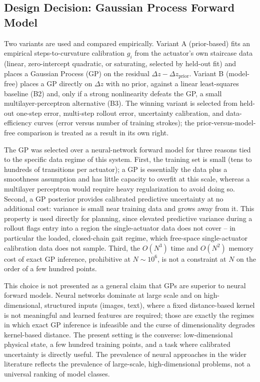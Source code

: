 \subsection{Design Decision: Gaussian Process Forward Model}

Two variants are used and compared empirically. Variant A (prior-based) fits an empirical steps-to-curvature calibration $g_i$ from the actuator's own staircase data (linear, zero-intercept quadratic, or saturating, selected by held-out fit) and places a Gaussian Process (GP) on the residual $\Delta z - \Delta z_{\mathrm{prior}}$. Variant B (model-free) places a GP directly on $\Delta z$ with no prior, against a linear least-squares baseline (B2) and, only if a strong nonlinearity defeats the GP, a small multilayer-perceptron alternative (B3). The winning variant is selected from held-out one-step error, multi-step rollout error, uncertainty calibration, and data-efficiency curves (error versus number of training strokes); the prior-versus-model-free comparison is treated as a result in its own right.

The GP was selected over a neural-network forward model for three reasons tied to the specific data regime of this system. First, the training set is small (tens to hundreds of transitions per actuator); a GP is essentially the data plus a smoothness assumption and has little capacity to overfit at this scale, whereas a multilayer perceptron would require heavy regularization to avoid doing so. Second, a GP posterior provides calibrated predictive uncertainty at no additional cost: variance is small near training data and grows away from it. This property is used directly for planning, since elevated predictive variance during a rollout flags entry into a region the single-actuator data does not cover -- in particular the loaded, closed-chain gait regime, which free-space single-actuator calibration data does not sample. Third, the $O(N^3)$ time and $O(N^2)$ memory cost of exact GP inference, prohibitive at $N \sim 10^6$, is not a constraint at $N$ on the order of a few hundred points.

This choice is not presented as a general claim that GPs are superior to neural forward models. Neural networks dominate at large scale and on high-dimensional, structured inputs (images, text), where a fixed distance-based kernel is not meaningful and learned features are required; those are exactly the regimes in which exact GP inference is infeasible and the curse of dimensionality degrades kernel-based distance. The present setting is the converse: low-dimensional physical state, a few hundred training points, and a task where calibrated uncertainty is directly useful. The prevalence of neural approaches in the wider literature reflects the prevalence of large-scale, high-dimensional problems, not a universal ranking of model classes.

